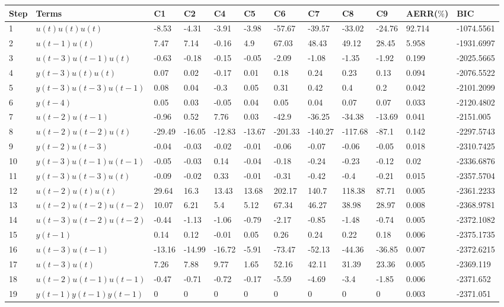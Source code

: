 \begin{tabular}{llllllllllll}
Step & Terms & C1 & C2 & C4 & C5 & C6 & C7 & C8 & C9 & AERR($\%$) & BIC \\ 
\hline 
1 & $u(t)u(t)u(t)$ & -8.53 & -4.31 & -3.91 & -3.98 & -57.67 & -39.57 & -33.02 & -24.76 & 92.714 & -1074.5561 \\ 
2 & $u(t-1)u(t)$ & 7.47 & 7.14 & -0.16 & 4.9 & 67.03 & 48.43 & 49.12 & 28.45 & 5.958 & -1931.6997 \\ 
3 & $u(t-3)u(t-1)u(t)$ & -0.63 & -0.18 & -0.15 & -0.05 & -2.09 & -1.08 & -1.35 & -1.92 & 0.199 & -2025.5665 \\ 
4 & $y(t-3)u(t)u(t)$ & 0.07 & 0.02 & -0.17 & 0.01 & 0.18 & 0.24 & 0.23 & 0.13 & 0.094 & -2076.5522 \\ 
5 & $y(t-3)u(t-3)u(t-1)$ & 0.08 & 0.04 & -0.3 & 0.05 & 0.31 & 0.42 & 0.4 & 0.2 & 0.042 & -2101.2099 \\ 
6 & $y(t-4)$ & 0.05 & 0.03 & -0.05 & 0.04 & 0.05 & 0.04 & 0.07 & 0.07 & 0.033 & -2120.4802 \\ 
7 & $u(t-2)u(t-1)$ & -0.96 & 0.52 & 7.76 & 0.03 & -42.9 & -36.25 & -34.38 & -13.69 & 0.041 & -2151.005 \\ 
8 & $u(t-2)u(t-2)u(t)$ & -29.49 & -16.05 & -12.83 & -13.67 & -201.33 & -140.27 & -117.68 & -87.1 & 0.142 & -2297.5743 \\ 
9 & $y(t-2)u(t-3)$ & -0.04 & -0.03 & -0.02 & -0.01 & -0.06 & -0.07 & -0.06 & -0.05 & 0.018 & -2310.7425 \\ 
10 & $y(t-3)u(t-1)u(t-1)$ & -0.05 & -0.03 & 0.14 & -0.04 & -0.18 & -0.24 & -0.23 & -0.12 & 0.02 & -2336.6876 \\ 
11 & $y(t-3)u(t-3)u(t)$ & -0.09 & -0.02 & 0.33 & -0.01 & -0.31 & -0.42 & -0.4 & -0.21 & 0.015 & -2357.5704 \\ 
12 & $u(t-2)u(t)u(t)$ & 29.64 & 16.3 & 13.43 & 13.68 & 202.17 & 140.7 & 118.38 & 87.71 & 0.005 & -2361.2233 \\ 
13 & $u(t-2)u(t-2)u(t-2)$ & 10.07 & 6.21 & 5.4 & 5.12 & 67.34 & 46.27 & 38.98 & 28.97 & 0.008 & -2368.9781 \\ 
14 & $u(t-3)u(t-2)u(t-2)$ & -0.44 & -1.13 & -1.06 & -0.79 & -2.17 & -0.85 & -1.48 & -0.74 & 0.005 & -2372.1082 \\ 
15 & $y(t-1)$ & 0.14 & 0.12 & -0.01 & 0.05 & 0.26 & 0.24 & 0.22 & 0.18 & 0.006 & -2375.1735 \\ 
16 & $u(t-3)u(t-1)$ & -13.16 & -14.99 & -16.72 & -5.91 & -73.47 & -52.13 & -44.36 & -36.85 & 0.007 & -2372.6215 \\ 
17 & $u(t-3)u(t)$ & 7.26 & 7.88 & 9.77 & 1.65 & 52.16 & 42.11 & 31.39 & 23.36 & 0.005 & -2369.119 \\ 
18 & $u(t-2)u(t-1)u(t-1)$ & -0.47 & -0.71 & -0.72 & -0.17 & -5.59 & -4.69 & -3.4 & -1.85 & 0.006 & -2371.652 \\ 
19 & $y(t-1)y(t-1)y(t-1)$ & 0 & 0 & 0 & 0 & 0 & 0 & 0 & 0 & 0.003 & -2371.051 \\ 
\hline 
\end{tabular}